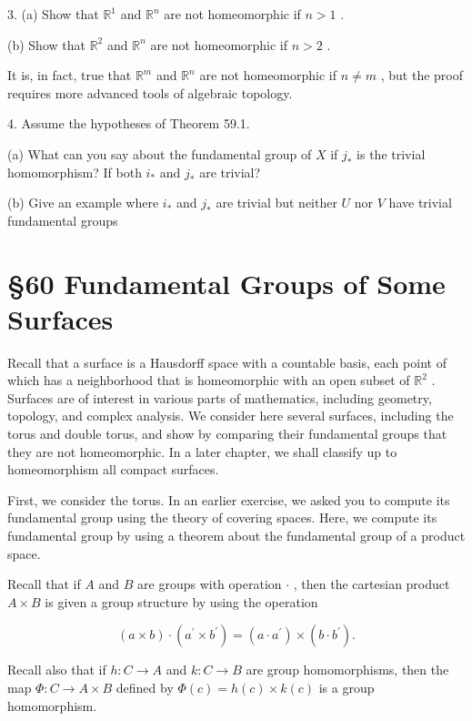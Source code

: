 3. (a) Show that \({\mathbb{R}}^{1}\) and \({\mathbb{R}}^{n}\) are not homeomorphic if \(n > 1\) .

(b) Show that \({\mathbb{R}}^{2}\) and \({\mathbb{R}}^{n}\) are not homeomorphic if \(n > 2\) .

It is, in fact, true that \({\mathbb{R}}^{m}\) and \({\mathbb{R}}^{n}\) are not homeomorphic if \(n \neq  m\) , but the proof requires more advanced tools of algebraic topology.

4. Assume the hypotheses of Theorem 59.1.

(a) What can you say about the fundamental group of \(X\) if \({j}_{ * }\) is the trivial homomorphism? If both \({i}_{ * }\) and \({j}_{ * }\) are trivial?

(b) Give an example where \({i}_{ * }\) and \({j}_{ * }\) are trivial but neither \(U\) nor \(V\) have trivial fundamental groups

\section*{§60 Fundamental Groups of Some Surfaces}

Recall that a surface is a Hausdorff space with a countable basis, each point of which has a neighborhood that is homeomorphic with an open subset of \({\mathbb{R}}^{2}\) . Surfaces are of interest in various parts of mathematics, including geometry, topology, and complex analysis. We consider here several surfaces, including the torus and double torus, and show by comparing their fundamental groups that they are not homeomorphic. In a later chapter, we shall classify up to homeomorphism all compact surfaces.

First, we consider the torus. In an earlier exercise, we asked you to compute its fundamental group using the theory of covering spaces. Here, we compute its fundamental group by using a theorem about the fundamental group of a product space.

Recall that if \(A\) and \(B\) are groups with operation \(\cdot\) , then the cartesian product \(A \times  B\) is given a group structure by using the operation

\[
\left( {a \times  b}\right)  \cdot  \left( {{a}^{\prime } \times  {b}^{\prime }}\right)  = \left( {a \cdot  {a}^{\prime }}\right)  \times  \left( {b \cdot  {b}^{\prime }}\right) .
\]

Recall also that if \(h : C \rightarrow  A\) and \(k : C \rightarrow  B\) are group homomorphisms, then the map \(\Phi  : C \rightarrow  A \times  B\) defined by \(\Phi \left( c\right)  = h\left( c\right)  \times  k\left( c\right)\) is a group homomorphism.

